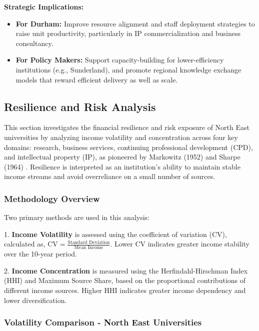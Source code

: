 \documentclass[journal,onecolumn, 10pt,draftclsnofoot]{IEEEtran}
\begin{document}
\textbf{Strategic Implications:}
\begin{itemize}
    \item \textbf{For Durham:} Improve resource alignment and staff deployment strategies to raise unit productivity, particularly in IP commercialization and business consultancy.
    
    \item \textbf{For Policy Makers:} Support capacity-building for lower-efficiency institutions (e.g., Sunderland), and promote regional knowledge exchange models that reward efficient delivery as well as scale.
\end{itemize}

\subsection{Resilience and Risk Analysis}

This section investigates the financial resilience and risk exposure of North East universities by analyzing income volatility and concentration across four key domains: research, business services, continuing professional development (CPD), and intellectual property (IP), as pioneered by Markowitz (1952) \cite{markowitz1952portfolio} and Sharpe (1964) \cite{sharpe1964capital}. Resilience is interpreted as an institution's ability to maintain stable income streams and avoid overreliance on a small number of sources.

\subsubsection{Methodology Overview}

Two primary methods are used in this analysis:

1. \textbf{Income Volatility} is assessed using the coefficient of variation (CV), calculated as, $\mathrm{CV}=\frac{\text{Standard Deviation}}{\text{Mean Income}}$. Lower CV indicates greater income stability over the 10-year period.

2. \textbf{Income Concentration} is measured using the Herfindahl-Hirschman Index (HHI) and Maximum Source Share, based on the proportional contributions of different income sources. Higher HHI indicates greater income dependency and lower diversification.

\subsubsection{Volatility Comparison - North East Universities}
\end{document}
